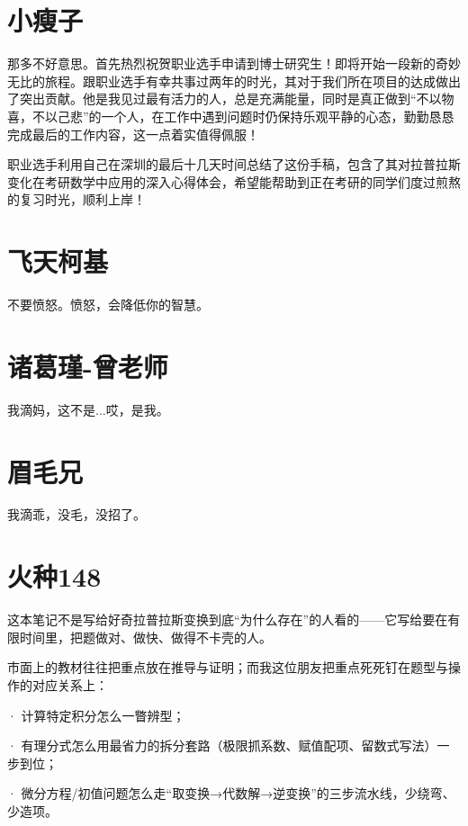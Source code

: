\documentclass[12pt]{report}
\begin{document}
  \section*{\textbullet \hspace{0.5em}小瘦子}

 那多不好意思。首先热烈祝贺职业选手申请到博士研究生！即将开始一段新的奇妙无比的旅程。跟职业选手有幸共事过两年的时光，其对于我们所在项目的达成做出了突出贡献。他是我见过最有活力的人，总是充满能量，同时是真正做到“不以物喜，不以己悲”的一个人，在工作中遇到问题时仍保持乐观平静的心态，勤勤恳恳完成最后的工作内容，这一点着实值得佩服！
 
 职业选手利用自己在深圳的最后十几天时间总结了这份手稿，包含了其对拉普拉斯变化在考研数学中应用的深入心得体会，希望能帮助到正在考研的同学们度过煎熬的复习时光，顺利上岸！  
   
 \section*{\textbullet \hspace{0.5em}飞天柯基} 
   
 不要愤怒。愤怒，会降低你的智慧。
 
 \section*{诸葛瑾-曾老师}
 
 我滴妈，这不是...哎，是我。
 
 \section*{眉毛兄}
 
 我滴乖，没毛，没招了。
 
 \section*{火种148}
 
 这本笔记不是写给好奇拉普拉斯变换到底“为什么存在”的人看的——它写给要在有限时间里，把题做对、做快、做得不卡壳的人。
 
 市面上的教材往往把重点放在推导与证明；而我这位朋友把重点死死钉在题型与操作的对应关系上：
 
 · 计算特定积分怎么一瞥辨型；
 
 · 有理分式怎么用最省力的拆分套路（极限抓系数、赋值配项、留数式写法）一步到位；
 
 · 微分方程/初值问题怎么走“取变换→代数解→逆变换”的三步流水线，少绕弯、少造项。
 
\end{document}

